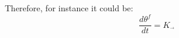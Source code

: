 Therefore, for instance it could be:
\begin{equation}
\frac{d \theta^f}{dt} = K_ \vec{}{}
\end{equation}